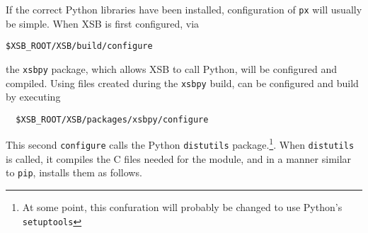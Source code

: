 If the correct Python libraries have been installed, configuration of
{\tt px} will usually be simple.  When XSB is first configured, via
\begin{verbatim}
$XSB_ROOT/XSB/build/configure
\end{verbatim}
the {\tt xsbpy} package, which allows XSB to call Python, will be
configured and compiled.  Using files created during the {\tt xsbpy}
build, \px{} can be configured and build by executing
\begin{verbatim}
  $XSB_ROOT/XSB/packages/xsbpy/configure
\end{verbatim}
This second {\tt configure} calls the Python {\tt distutils}
package.\footnote{At some point, this confuration will probably be
  changed to use Python's {\tt setuptools}}.  When {\tt distutils} is
called, it compiles the C files needed for the \px{} module, and in a
manner similar to {\tt pip}, installs them as follows.

